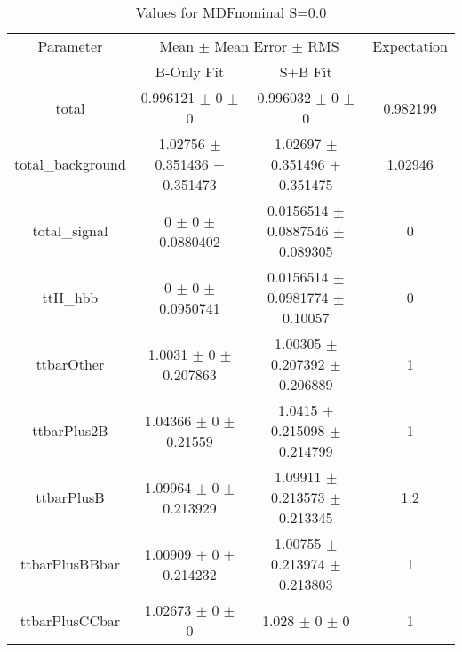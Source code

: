 \begin{table}
\centering
\caption{Values for MDFnominal S=0.0}
\begin{tabular}{cccc}
\toprule
Parameter & \multicolumn{2}{c}{Mean $\pm$ Mean Error $\pm$ RMS} & Expectation\\
 & B-Only Fit & S+B Fit & \\
\midrule
total & \num{0.996121} $\pm$ \num{0} $\pm$ \num{0} & \num{0.996032} $\pm$ \num{0} $\pm$ \num{0} & \num{0.982199}\\
total\_background & \num{1.02756} $\pm$ \num{0.351436} $\pm$ \num{0.351473} & \num{1.02697} $\pm$ \num{0.351496} $\pm$ \num{0.351475} & \num{1.02946}\\
total\_signal & \num{0} $\pm$ \num{0} $\pm$ \num{0.0880402} & \num{0.0156514} $\pm$ \num{0.0887546} $\pm$ \num{0.089305} & \num{0}\\
ttH\_hbb & \num{0} $\pm$ \num{0} $\pm$ \num{0.0950741} & \num{0.0156514} $\pm$ \num{0.0981774} $\pm$ \num{0.10057} & \num{0}\\
ttbarOther & \num{1.0031} $\pm$ \num{0} $\pm$ \num{0.207863} & \num{1.00305} $\pm$ \num{0.207392} $\pm$ \num{0.206889} & \num{1}\\
ttbarPlus2B & \num{1.04366} $\pm$ \num{0} $\pm$ \num{0.21559} & \num{1.0415} $\pm$ \num{0.215098} $\pm$ \num{0.214799} & \num{1}\\
ttbarPlusB & \num{1.09964} $\pm$ \num{0} $\pm$ \num{0.213929} & \num{1.09911} $\pm$ \num{0.213573} $\pm$ \num{0.213345} & \num{1.2}\\
ttbarPlusBBbar & \num{1.00909} $\pm$ \num{0} $\pm$ \num{0.214232} & \num{1.00755} $\pm$ \num{0.213974} $\pm$ \num{0.213803} & \num{1}\\
ttbarPlusCCbar & \num{1.02673} $\pm$ \num{0} $\pm$ \num{0} & \num{1.028} $\pm$ \num{0} $\pm$ \num{0} & \num{1}\\
\bottomrule
\end{tabular}
\end{table}